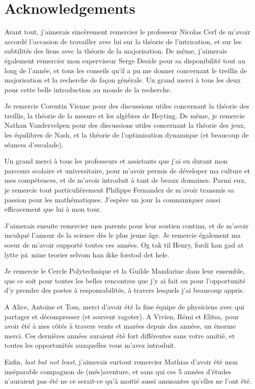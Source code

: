 \section*{Acknowledgements}

Avant tout, j'aimerais sincèrement remercier le professeur Nicolas Cerf de m'avoir accordé l'occasion de travailler avec lui sur la théorie de l'intrication, et sur les subtilités des liens avec la théorie de la majorisation. De même, j'aimerais également remercier mon superviseur Serge Deside pour sa disponibilité tout au long de l'année, et tous les conseils qu'il a pu me donner concernant le treillis de majorisation et la recherche de façon générale. Un grand merci à tous les deux pour cette belle introduction au monde de la recherche. 

Je remercie Corentin Vienne pour des discussions utiles concernant la théorie des treillis, la théorie de la mesure et les algèbres de Heyting. De même, je remercie Nathan Vandervelpen pour des discussions utiles concernant la théorie des jeux, les équilibres de Nash, et la théorie de l'optimisation dynamique (et beaucoup de séances d'escalade).

Un grand merci à tous les professeurs et assistants que j'ai eu durant mon parcours scolaire et universitaire, pour m'avoir permis de déveloper ma culture et mes compétences, et de m'avoir introduit à tant de beaux domaines. Parmi eux, je remercie tout particulièrement Philippe Fernandez de m'avoir transmis sa passion pour les mathématiques. J'espère un jour la communiquer aussi efficacement que lui à mon tour.

J'aimerais ensuite remercier mes parents pour leur soutien continu, et de m'avoir inculqué l'amour de la science dès le plus jeune âge. Je remercie également ma soeur de m'avoir supporté toutes ces années. Og tak til Henry, fordi han gad at lytte p\aa \, mine teorier selvom han ikke forstod det hele.

Je remercie le Cercle Polytechnique et la Guilde Mandarine dans leur ensemble, que ce soit pour toutes les belles rencontres que j'y ai fait ou pour l'opportunité d'y prendre des postes à responsabilités, à travers lesquels j'ai beaucoup appris.

A Alice, Antoine et Tom, merci d'avoir été la fine équipe de physiciens avec qui partager et décompresser (et souvent ragoter). A Vivien, Rémi et Elitsa, pour avoir été à mes côtés à travers vents et marées depuis des années, un énorme merci. Ces dernières années auraient été fort différentes sans votre amitié, et toutes les opportunités auxquelles vous m'avez introduit.

Enfin, \textit{last but not least}, j'aimerais surtout remercier Mathias d'avoir été mon inséparable compagnon de (més)aventure, et sans qui ces 5 années d'études n'auraient pas été ne ce serait-ce qu'à moitié aussi amusantes qu'elles ne l'ont été.

